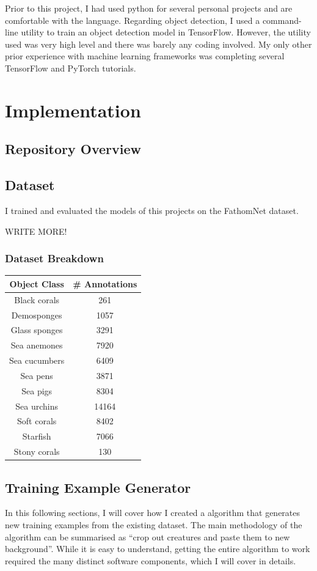 \documentclass[12pt,a4paper,twoside,openright]{report}
\begin{document}
Prior to this project, I had used python for several personal projects and are comfortable with the language. Regarding object detection, I used a command-line utility to train an object detection model in TensorFlow. However, the utility used was very high level and there was barely any coding involved. My only other prior experience with machine learning frameworks was completing several TensorFlow and PyTorch tutorials.

\chapter{Implementation}
\section{Repository Overview}
\section{Dataset}

I trained and evaluated the models of this projects on the FathomNet \cite{katija_fathomnet_2022} dataset.

WRITE MORE!
\subsection{Dataset Breakdown}
\begin{center}
    \begin{tabular}{||c c||}
    \hline
     \textbf{Object Class} & \textbf{\# Annotations}  \\
     \hline
     \hline 
     Black corals & 261\\
     Demosponges & 1057 \\
     Glass sponges & 3291 \\
     Sea anemones & 7920 \\
     Sea cucumbers & 6409 \\
     Sea pens & 3871 \\
     Sea pigs & 8304 \\
     Sea urchins & 14164 \\
     Soft corals & 8402 \\
     Starfish & 7066 \\
     Stony corals & 130 \\
     \hline
    \end{tabular}
\end{center}

\section{Training Example Generator}
In this following sections, I will cover how I created a algorithm that generates new training examples from the existing dataset. The main methodology of the algorithm can be summarised as ``crop out creatures and paste them to new background''. While it is easy to understand, getting the entire algorithm to work required the many distinct software components, which I will cover in details.
\end{document}
